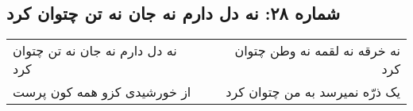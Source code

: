 \begin{center}
\section*{شماره ۲۸: نه دل دارم نه جان نه تن چتوان کرد}
\label{sec:028}
\begin{longtable}{l p{0.5cm} r}
نه دل دارم نه جان نه تن چتوان کرد
&&
نه خرقه نه لقمه نه وطن چتوان کرد
\\
از خورشیدی کزو همه کون پرست
&&
یک ذرّه نمیرسد به من چتوان کرد
\\
\end{longtable}
\end{center}
